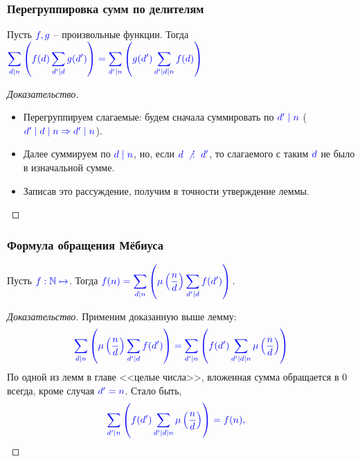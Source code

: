 \begin{frame}[t]
    \frametitle{Перегруппировка сумм по делителям}
    \begin{lemma} \vspace{3mm}
        Пусть $\color{blue} f,g$ -- произвольные функции. Тогда $\color{blue} \displaystyle \sum_{d \mid n} \left( f(d) \sum_{d' \mid d} g(d') \right) = \sum_{d' \mid n} \left( g(d') \sum_{d' \mid d \mid n} f(d) \right)  $
    \end{lemma}
    \begin{proof}[Доказательство]
    \begin{itemize}
        \item Перегруппируем слагаемые: будем сначала суммировать по $\color{blue} d' \mid n$ ($\color{blue} d' \mid d \mid n \Rightarrow d' \mid n$). 
        \item Далее суммируем по $\color{blue} d \mid n$, но, если $\color{blue} d \nDiv d'$, то слагаемого с таким $\color{blue} d$ не было в изначальной сумме. 
        \item Записав это рассуждение, получим в точности утверждение леммы.
    \end{itemize}
    \end{proof}
\end{frame}

\begin{frame}[t]
    \frametitle{Формула обращения Мёбиуса}
    \small
    \begin{theorem}[]
        Пусть $\color{blue} f: \mathbb{N} \mapsto$. Тогда $\color{blue} \displaystyle f(n) = \sum_{d \mid n} \left( \mu \left( \frac{n}{d} \right) \sum_{d' \mid d} f(d')  \right)$.
    \end{theorem}

    \begin{proof}[Доказательство]
        Применим доказанную выше лемму: \begin{gather*}
            \color{blue} \sum_{d \mid n} \left( \mu \left( \frac{n}{d} \right) \sum_{d' \mid d} f(d')  \right) = \sum_{d' \mid n} \left( f(d') \sum_{d' \mid d \mid n} \mu \left( \frac{n}{d} \right)  \right) 
        \end{gather*}
        По одной из лемм в главе <<целые числа>>, вложенная сумма обращается в 0 всегда, кроме случая $\color{blue} d' = n$. Стало быть,  \[
            \color{blue} \sum_{d' \mid n} \left( f(d') \sum_{d' \mid d \mid n} \mu \left( \frac{n}{d} \right) \right) = f(n), \ \ \ \qedsymbol
        \]
    \end{proof}
\end{frame}

